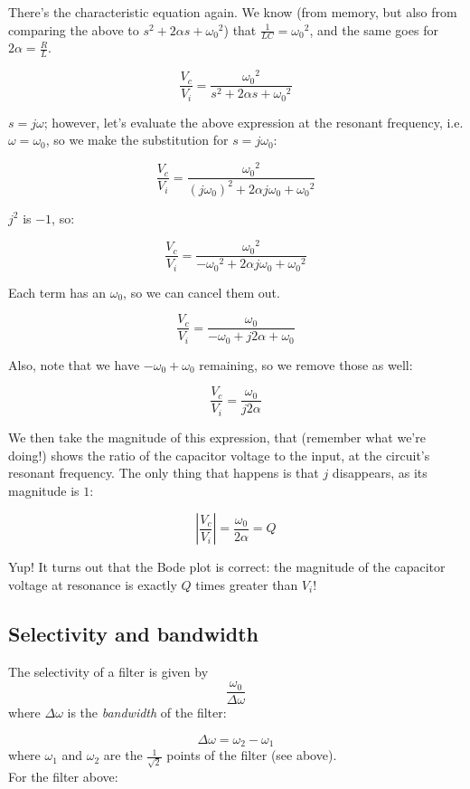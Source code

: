 \documentclass[12pt,a4paper]{report}
\begin{document}
There's the characteristic equation again. We know (from memory, but also from comparing the above to $s^2 + 2\alpha s + {\omega_0}^2$) that $\displaystyle \frac{1}{LC} = {\omega_0}^2$, and the same goes for $\displaystyle 2 \alpha = \frac{R}{L}$.

\[ \frac{V_c}{V_i} = \frac{{\omega_0}^2}{s^2 + 2 \alpha s + {\omega_0}^2} \]

$s = j\omega$; however, let's evaluate the above expression at the resonant frequency, i.e. $\omega = \omega_0$, so we make the substitution for $s = j\omega_0$:

\[ \frac{V_c}{V_i} = \frac{{\omega_0}^2}{(j\omega_0)^2 + 2 \alpha j\omega_0 + {\omega_0}^2} \]

$j^2$ is $-1$, so:

\[ \frac{V_c}{V_i} = \frac{{\omega_0}^2}{-{\omega_0}^2 + 2 \alpha j\omega_0 + {\omega_0}^2} \]

Each term has an $\omega_0$, so we can cancel them out. 

\[ \frac{V_c}{V_i} = \frac{{\omega_0}}{-{\omega_0} + j 2 \alpha + {\omega_0}} \]


Also, note that we have $-\omega_0 +\omega_0$ remaining, so we remove those as well:

\[ \frac{V_c}{V_i} = \frac{{\omega_0}}{j 2 \alpha} \]

We then take the magnitude of this expression, that (remember what we're doing!) shows the ratio of the capacitor voltage to the input, at the circuit's resonant frequency. The only thing that happens is that $j$ disappears, as its magnitude is $1$:

\[ \left| \frac{V_c}{V_i} \right| = \frac{\omega_0}{2\alpha} = Q \]

Yup! It turns out that the Bode plot is correct: the magnitude of the capacitor voltage at resonance is exactly $Q$ times greater than $V_i$!


\subsection{Selectivity and bandwidth}
The selectivity of a filter is given by 
\[ \frac{\omega_0}{\Delta \omega} \]
where $\Delta \omega$ is the \emph{bandwidth} of the filter:

\[ \Delta \omega = \omega_2 - \omega_1 \]
where $\omega_1$ and $\omega_2$ are the $\displaystyle \frac{1}{\sqrt{2}}$ points of the filter (see above).\\
For the filter above:
\end{document}
